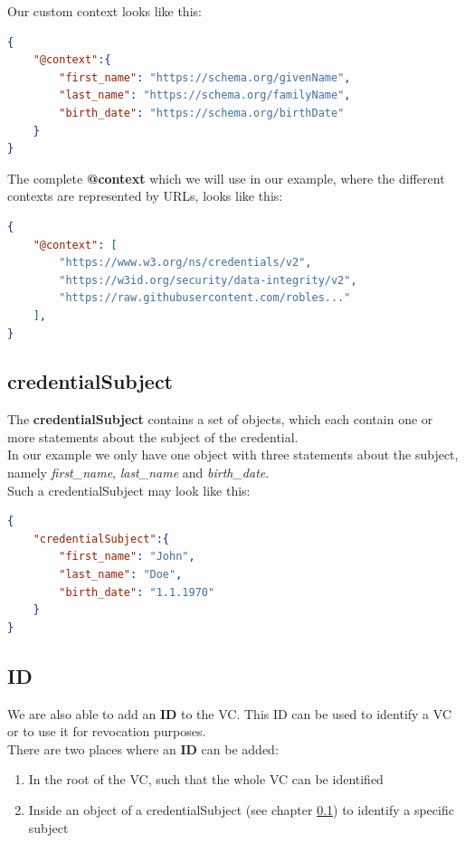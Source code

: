 \documentclass[
	a4paper               %
	,BCOR=0mm            %
	,bibliography=totoc   %
	,listof=totoc         %
	,monolingual
	,twoside=false
]{bfhthesis}              %
\begin{document}
Our custom context looks like this:
\begin{lstlisting}[language=json,firstnumber=1,caption={Example custom context},captionpos=b]
{
	"@context":{
		"first_name": "https://schema.org/givenName",
		"last_name": "https://schema.org/familyName",
		"birth_date": "https://schema.org/birthDate"
	}
}
\end{lstlisting}

The complete \textbf{@context} which we will use in our example, where the different contexts are represented by URLs, looks like this:
\begin{lstlisting}[language=json,firstnumber=1,caption={Example context},captionpos=b]
{
	"@context": [
		"https://www.w3.org/ns/credentials/v2",
		"https://w3id.org/security/data-integrity/v2",
		"https://raw.githubusercontent.com/robles..."
	],
}
\end{lstlisting}

\subsection{credentialSubject}
\label{subsub:credentialsubject}
The \textbf{credentialSubject} contains a set of objects, which each contain one or more statements about the subject of the credential.\\
In our example we only have one object with three statements about the subject, namely \textit{first\_name}, \textit{last\_name} and \textit{birth\_date}.\\
Such a credentialSubject may look like this:\newpage
\begin{lstlisting}[language=json,firstnumber=1,caption={Example credentialSubject},captionpos=b]
{
	"credentialSubject":{
		"first_name": "John",
		"last_name": "Doe",
		"birth_date": "1.1.1970"
	}
}
\end{lstlisting}

\subsection{ID}
We are also able to add an \textbf{ID} to the VC. This ID can be used to identify a VC or to use it for revocation purposes.\\
There are two places where an \textbf{ID} can be added:
\begin{enumerate}
	\item In the root of the VC, such that the whole VC can be identified
	\item Inside an object of a credentialSubject (see chapter \ref{subsub:credentialsubject}) to identify a specific subject
\end{enumerate}
\end{document}
